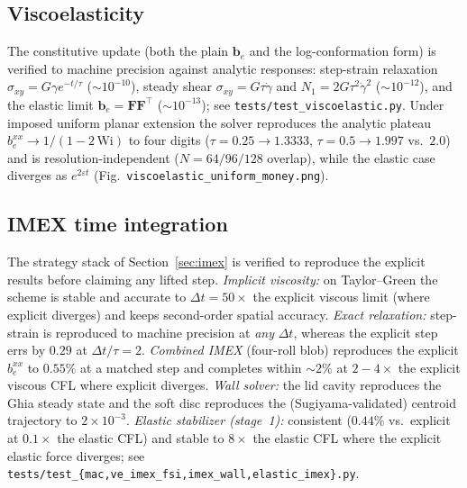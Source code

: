 \documentclass[11pt]{article}
\newcommand{\Ften}{\bm{F}}
\newcommand{\bten}{\bm{b}}
\begin{document}
\subsection{Viscoelasticity}
The constitutive update (both the plain $\bten_e$ and the log-conformation form) is
verified to machine precision against analytic responses: step-strain relaxation
$\sigma_{xy}=G\gamma e^{-t/\tau}$ ($\sim\!10^{-10}$), steady shear
$\sigma_{xy}=G\tau\dot\gamma$ and $N_1=2G\tau^2\dot\gamma^2$ ($\sim\!10^{-12}$), and
the elastic limit $\bten_e=\Ften\Ften^{\!\top}$ ($\sim\!10^{-13}$); see
\texttt{tests/test\_viscoelastic.py}. Under imposed uniform planar extension the
solver reproduces the analytic plateau $b_e^{xx}\!\to\!1/(1-2\,\mathrm{Wi})$ to four
digits ($\tau{=}0.25\!\to\!1.3333$, $\tau{=}0.5\!\to\!1.997$ vs.\ $2.0$) and is
resolution-independent ($N{=}64/96/128$ overlap), while the elastic case diverges as
$e^{2\varepsilon t}$ (Fig.~\texttt{viscoelastic\_uniform\_money.png}).

\subsection{IMEX time integration}
The strategy stack of Section~\ref{sec:imex} is verified to reproduce the explicit
results before claiming any lifted step. \emph{Implicit viscosity:} on Taylor--Green
the scheme is stable and accurate to $\Delta t=50\times$ the explicit viscous limit
(where explicit diverges) and keeps second-order spatial accuracy. \emph{Exact
relaxation:} step-strain is reproduced to machine precision at \emph{any} $\Delta t$,
whereas the explicit step errs by $0.29$ at $\Delta t/\tau=2$. \emph{Combined IMEX}
(four-roll blob) reproduces the explicit $b_e^{xx}$ to $0.55\%$ at a matched step and
completes within ${\sim}2\%$ at $2\!-\!4\times$ the explicit viscous CFL where explicit
diverges. \emph{Wall solver:} the lid cavity reproduces the Ghia steady state and the
soft disc reproduces the (Sugiyama-validated) centroid trajectory to $2\times10^{-3}$.
\emph{Elastic stabilizer (stage~1):} consistent ($0.44\%$ vs.\ explicit at $0.1\times$
the elastic CFL) and stable to $8\times$ the elastic CFL where the explicit elastic
force diverges; see \texttt{tests/test\_\{mac,ve\_imex\_fsi,imex\_wall,elastic\_imex\}.py}.
\end{document}
